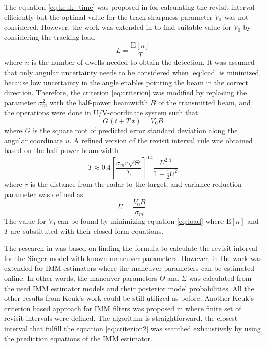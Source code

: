 \documentclass[english, 12pt, a4paper, elec, utf8, a-1b, online]{aaltothesis}
\newcommand{\E}[1]{\mathrm{E}\left[ #1 \right]}
\begin{document}
The equation \eqref{eq:keuk_time} was proposed in \cite{Keuk1975} for calculating the revisit interval efficiently but the optimal value for the track sharpness parameter $V_0$ was not considered.
However, the work was extended in \cite{vanKeuk1993} to find suitable value for $V_0$ by considering the tracking load
\begin{equation}\label{eq:load}
    L = \frac{\E{n}}{T}
\end{equation}
where $n$ is the number of dwells needed to obtain the detection.
It was assumed that only angular uncertainty needs to be considered when \eqref{eq:load} is minimized, 
because low uncertainty in the angle enables pointing the beam in the correct direction.
Therefore, the criterion \eqref{eq:criterion} was modified by replacing the parameter $\sigma_m^2$ with the half-power beamwidth $B$ of the transmitted beam, and the operations were done in U/V-coordinate system such that
\begin{equation} \label{eq:criterion2}
    G(t + T | t) = V_0 B
\end{equation}
where $G$ is the square root of predicted error standard deviation along the angular coordinate $u$. 
A refined version of the revisit interval rule was obtained based on the half-power beam width
\begin{equation}\label{eq:van_keuk_revisited}
    T \approx 0.4 \left[ \frac{\sigma_m r \sqrt{\Theta}}{\Sigma} \right]^{0.4} \frac{U^{2.4}}{1+\frac{1}{2}U^2}
\end{equation}
where $r$ is the distance from the radar to the target, and variance reduction parameter was defined as
\begin{equation}
    U = \frac{V_0 B}{\sigma_m}.
\end{equation}
The value for $V_0$ can be found by minimizing equation \eqref{eq:load} where $\E{n}$ and $T$ are substituted with their closed-form equations.

The research in \cite{Keuk1975, vanKeuk1993} was based on finding the formula to calculate the revisit interval for the Singer model with known maneuver parameters.
However, in \cite{Shin1995} the work was extended for IMM estimators where the maneuver parameters can be estimated online.
In other words, the maneuver parameters $\Theta$ and $\Sigma$ was calculated from the used IMM estimator models and their posterior model probabilities.
All the other results from Keuk's work could be still utilized as before.
Another Keuk's criterion based approach for IMM filters was proposed in \cite{Daeipour1994} where finite set of revisit intervals were defined.
The algorithm is straightforward, the closest interval that fulfill the equation \eqref{eq:criterion2} was searched exhaustively by using the prediction equations of the IMM estimator.
\end{document}
